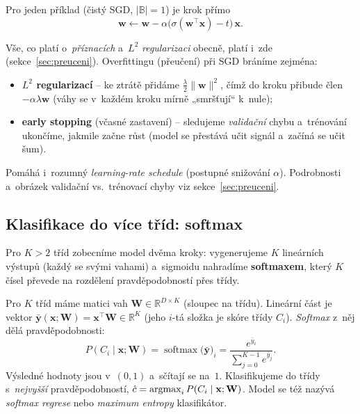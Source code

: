 \noindent Pro jeden příklad (čistý SGD, $|\mathbb{B}|=1$) je krok přímo
\[ \mathbf{w}\leftarrow\mathbf{w}-\alpha\big(\sigma(\mathbf{w}^{\!\top}\mathbf{x})-t\big)\,\mathbf{x}. \]

\begin{poznamka}
Vše, co platí o~\emph{příznacích} a~$L^2$ \emph{regularizaci} obecně, platí i~zde (sekce~\ref{sec:preuceni}). Overfittingu (přeučení) při SGD bráníme zejména:
\begin{itemize}
  \item \textbf{$L^2$ regularizací} -- ke ztrátě přidáme $\tfrac{\lambda}{2}\|\mathbf{w}\|^2$, čímž do kroku přibude člen $-\alpha\lambda\mathbf{w}$ (váhy se v~každém kroku mírně „smršťují`` k~nule);
  \item \textbf{early stopping} (včasné zastavení) -- sledujeme \emph{validační} chybu a~trénování ukončíme, jakmile začne růst (model se přestává učit signál a~začíná se učit šum).
\end{itemize}
Pomáhá i~rozumný \emph{learning-rate schedule} (postupné snižování $\alpha$). Podrobnosti a~obrázek validační vs.\ trénovací chyby viz sekce~\ref{sec:preuceni}.
\end{poznamka}

\subsection{Klasifikace do více tříd: softmax}

Pro $K>2$ tříd zobecníme model dvěma kroky: vygenerujeme $K$ lineárních výstupů (každý se svými vahami) a~sigmoidu nahradíme \textbf{softmaxem}, který $K$ čísel převede na rozdělení pravděpodobností přes třídy.

\begin{definice}
Pro $K$ tříd máme matici vah $\mathbf{W}\in\mathbb{R}^{D\times K}$ (sloupec na třídu). Lineární část je vektor $\bar{\mathbf{y}}(\mathbf{x};\mathbf{W})=\mathbf{x}^{\!\top}\mathbf{W}\in\mathbb{R}^K$ (jeho $i$-tá složka je skóre třídy $C_i$). \emph{Softmax} z~něj dělá pravděpodobnosti:
\[ P(C_i\mid\mathbf{x};\mathbf{W})=\operatorname{softmax}\big(\bar{\mathbf{y}}\big)_i=\frac{e^{\bar y_i}}{\sum_{j=0}^{K-1} e^{\bar y_j}}. \]
Výsledné hodnoty jsou v~$(0,1)$ a~sčítají se na~$1$. Klasifikujeme do třídy s~\emph{nejvyšší} pravděpodobností, $\hat c=\operatorname*{argmax}_i P(C_i\mid\mathbf{x};\mathbf{W})$. Model se též nazývá \emph{softmax regrese} nebo \emph{maximum entropy} klasifikátor.
\end{definice}

